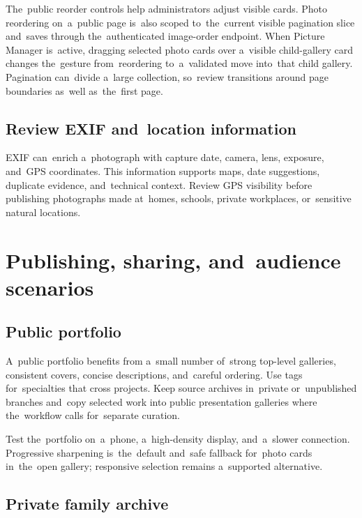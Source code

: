 \documentclass[11pt,a4paper]{article}
\begin{document}
The~public reorder controls help administrators adjust visible cards. Photo
reordering on~a~public page is~also scoped to~the~current visible pagination
slice and~saves through the~authenticated image-order endpoint. When Picture
Manager is~active, dragging selected photo cards over a~visible child-gallery
card changes the~gesture from~reordering to~a~validated move into~that child
gallery. Pagination can~divide a~large collection, so~review transitions around
page boundaries as~well as~the~first page.

\subsection{Review EXIF and~location information}

EXIF can~enrich a~photograph with capture date, camera, lens, exposure, and~GPS
coordinates. This information supports maps, date suggestions, duplicate
evidence, and~technical context. Review GPS visibility before publishing
photographs made at~homes, schools, private workplaces, or~sensitive natural
locations.

\section{Publishing, sharing, and~audience scenarios}
\label{sec:audiences}

\subsection{Public portfolio}

A~public portfolio benefits from a~small number of~strong top-level galleries,
consistent covers, concise descriptions, and~careful ordering. Use tags
for~specialties that cross projects. Keep source archives in~private
or~unpublished branches and~copy selected work into public presentation
galleries where the~workflow calls for~separate curation.

Test the~portfolio on~a~phone, a~high-density display, and~a~slower connection.
Progressive sharpening is~the~default and~safe fallback for~photo cards
in~the~open gallery; responsive selection remains a~supported alternative.

\subsection{Private family archive}
\end{document}
